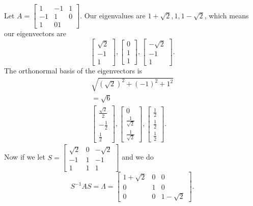 \begin{eg}
  Let $A=\begin{bmatrix} 1&-1&1\\-1&1&0\\1&01 \end{bmatrix} $. Our eigenvalues are $1+\sqrt{2},1,1-\sqrt{2}  $, which means our eigenvectors are \[
  \begin{bmatrix} \sqrt{2} \\-1\\1 \end{bmatrix} ,\begin{bmatrix} 0\\1\\1 \end{bmatrix} ,\begin{bmatrix} -\sqrt{2} \\-1\\1 \end{bmatrix} 
  .\] 
  The orthonormal basis of the eigenvectors is 
  \begin{align*}
    \sqrt{(\sqrt{2} )^2+(-1)^2+1^2}\\
    =\sqrt{6}\\
    \begin{bmatrix} \frac{\sqrt{2} }{2}\\-\frac{1}{2}\\\frac{1}{2} \end{bmatrix} ,\begin{bmatrix} 0\\\frac{1}{\sqrt{2} }\\\frac{1}{\sqrt{2} } \end{bmatrix} ,\begin{bmatrix} \frac{1}{2}\\\frac{1}{2}\\\frac{1}{2} \end{bmatrix} 
  .\end{align*}
  Now if we let $S=\begin{bmatrix} \sqrt{2} &0&-\sqrt{2}\\-1&1&-1\\1&1&1  \end{bmatrix} $ and we do \[
  S^{-1}AS= \Lambda=\begin{bmatrix} 1+\sqrt{2}&0&0\\0&1&0\\0&0&1-\sqrt{2}   \end{bmatrix} 
  .\] 
\end{eg}

